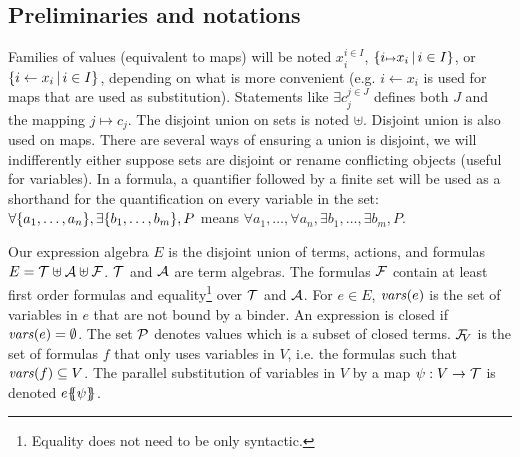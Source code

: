 \documentclass[runningheads]{llncs}
\begin{document}
\subsection{Preliminaries and notations}
Families of values (equivalent to maps) will be noted \(x_i^{i \in I}\), \(\mset{i \mapsto x_i}{i \in I}\), or \(\mset{i \gets x_i}{i \in I}\), depending on what is more convenient (e.g. $i \gets x_i$ is used for maps that are used as substitution). Statements like  $\exists c_j^{j \in J}$ defines both $J$ and the mapping ${j \mapsto c_j}$.
The disjoint union on sets is noted \(\uplus\).
Disjoint union is also used on maps.
There are several ways of ensuring a union is disjoint, we will indifferently either suppose sets are disjoint or rename conflicting objects (useful for variables).
In a formula, a quantifier followed by a finite set will be used as a shorthand for the quantification on every variable in the set:
\(\forall \mbrc{a_1, \dots, a_n}, \exists \mbrc{b_1, \dots, b_m}, P\) means \(\forall a_1, \dots, \forall a_n, \exists b_1, \dots, \exists b_m, P\).

Our expression algebra \(E\) is the disjoint union  of  terms,  actions, and  formulas
\( E=\terms \uplus \actions \uplus \formulas\).
\(\terms\) and \(\actions\) are term algebras.
The formulas \(\formulas\) contain at least first order formulas and equality\footnote{Equality does not need to be only syntactic.} over \(\terms\) and \(\actions\). 
For \(e \in E\),
 \(\fvars{e}\) is the set of variables in  $e$ that are not bound by a binder. 
An expression is closed if \(\fvars{e}=\emptyset\).
The set \(\values\) denotes values which is a subset of closed terms. \(\rformulas[V]\) is the set of formulas $f$ that only uses variables in $V$, i.e. the formulas such that  \(\fvars{f}\subseteq V\).
The parallel substitution of variables in \(V\) by a map \(\psi: V \to \terms\) is denoted \(e\psubst{\psi}\).
\end{document}
